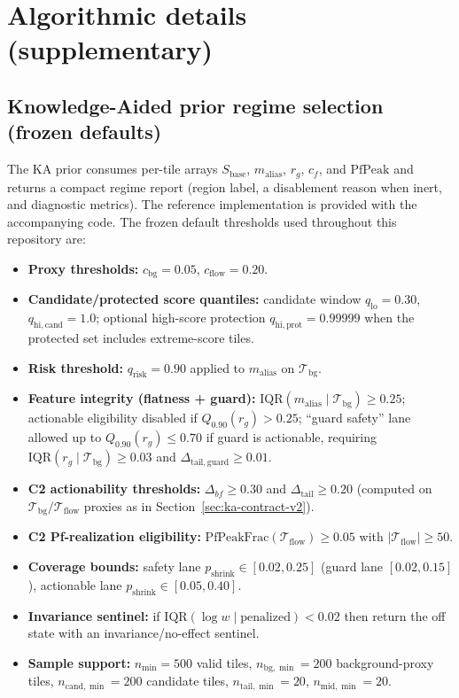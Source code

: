 \documentclass[11pt]{article}
\newif\ifSTAPSUPPLEMENTONLY
\begin{document}
\section{Algorithmic details (supplementary)}
\label{app:alg-details}

\subsection{Knowledge-Aided prior regime selection (frozen defaults)}
The KA prior consumes per-tile arrays
$S_{\mathrm{base}}$, $m_{\mathrm{alias}}$, $r_g$, $c_f$, and $\mathrm{PfPeak}$ and returns a compact regime report (region label, a disablement reason when inert, and diagnostic metrics). The reference implementation is provided with the accompanying code. The frozen default thresholds used throughout this repository are:
  \begin{itemize}[nosep]
	  \item \textbf{Proxy thresholds:} $c_{\mathrm{bg}}=0.05$, $c_{\mathrm{flow}}=0.20$.
	  \item \textbf{Candidate/protected score quantiles:} candidate window $q_{\mathrm{lo}}=0.30$, $q_{\mathrm{hi,cand}}=1.0$; optional high-score protection $q_{\mathrm{hi,prot}}=0.99999$ when the protected set includes extreme-score tiles.
	  \item \textbf{Risk threshold:} $q_{\mathrm{risk}}=0.90$ applied to $m_{\mathrm{alias}}$ on $\mathcal{T}_{\mathrm{bg}}$.
  \item \textbf{Feature integrity (flatness + guard):} $\mathrm{IQR}(m_{\mathrm{alias}}\mid\mathcal{T}_{\mathrm{bg}})\ge 0.25$; actionable eligibility disabled if $Q_{0.90}(r_g)>0.25$; ``guard safety'' lane allowed up to $Q_{0.90}(r_g)\le 0.70$ if guard is actionable, requiring $\mathrm{IQR}(r_g\mid\mathcal{T}_{\mathrm{bg}})\ge 0.03$ and $\Delta_{\mathrm{tail,guard}}\ge 0.01$.
  \item \textbf{C2 actionability thresholds:} $\Delta_{bf}\ge 0.30$ and $\Delta_{\mathrm{tail}}\ge 0.20$ (computed on $\mathcal{T}_{\mathrm{bg}}/\mathcal{T}_{\mathrm{flow}}$ proxies as in \ifSTAPSUPPLEMENTONLY the main paper\else Section~\ref{sec:ka-contract-v2}\fi).
  \item \textbf{C2 Pf-realization eligibility:} $\mathrm{PfPeakFrac}(\mathcal{T}_{\mathrm{flow}})\ge 0.05$ with $|\mathcal{T}_{\mathrm{flow}}|\ge 50$.
  \item \textbf{Coverage bounds:} safety lane $p_{\mathrm{shrink}}\in[0.02,0.25]$ (guard lane $[0.02,0.15]$), actionable lane $p_{\mathrm{shrink}}\in[0.05,0.40]$.
	  \item \textbf{Invariance sentinel:} if $\mathrm{IQR}(\log w\mid \text{penalized}) < 0.02$ then return the off state with an invariance/no-effect sentinel.
	  \item \textbf{Sample support:} $n_{\min}=500$ valid tiles, $n_{\mathrm{bg},\min}=200$ background-proxy tiles, $n_{\mathrm{cand},\min}=200$ candidate tiles, $n_{\mathrm{tail},\min}=20$, $n_{\mathrm{mid},\min}=20$.
  \end{itemize}
\end{document}

